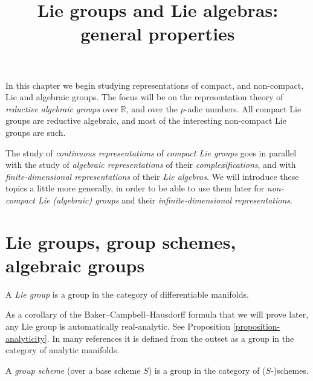 

%


\title{Lie groups and Lie algebras: general properties}


\maketitle

\label{section-phantom}


\tableofcontents



In this chapter we begin studying representations of compact, and non-compact, Lie and algebraic groups. The focus will be on the representation theory of \emph{reductive algebraic groups} over $\mathbb R$, and over the $p$-adic numbers. All compact Lie groups are reductive algebraic, and most of the interesting non-compact Lie groups are such. 

The study of \emph{continuous representations} of \emph{compact Lie groups} goes in parallel with the study of \emph{algebraic representations} of their \emph{complexifications}, and with \emph{finite-dimensional representations} of their \emph{Lie algebras}. We will introduce these topics a little more generally, in order to be able to use them later for \emph{non-compact Lie (algebraic) groups} and their \emph{infinite-dimensional representations}.

\section{Lie groups, group schemes, algebraic groups}
\label{section-Liegroups}

\begin{definition}
 \label{definition-Liegroup}
A {\it Lie group} is a group in the category of differentiable manifolds. 
\end{definition}

\begin{remark}
 \label{remark-Liegroup-analytic}
As a corollary of the Baker--Campbell--Hausdorff formula that we will prove later, any Lie group is automatically real-analytic. See Proposition \ref{proposition-analyticity}. In many references it is defined from the outset as a group in the category of analytic manifolds.
\end{remark}


\begin{definition}
\label{definition-groupscheme}
A {\it group scheme} (over a base scheme $S$) is a group in the category of ($S$-)schemes. 
\end{definition}

